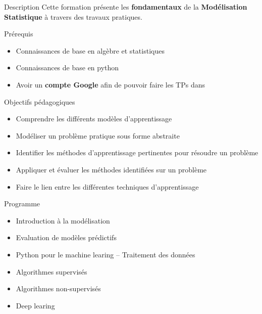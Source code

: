 
\begin{frame}{Description}
  Cette formation présente les \textbf{fondamentaux} de la \textbf{Modélisation Statistique} à travers des travaux pratiques.
\end{frame}

\begin{frame}{Prérequis}
  \begin{itemize}
  \item Connaissances de base en algèbre et statistiques
  \item Connaissances de base en python
  \item Avoir un \textbf{compte Google} afin de pouvoir faire les TPs dans 
  \end{itemize}
\end{frame}

\begin{frame}{Objectifs pédagogiques}
  \begin{itemize}
  \item Comprendre les différents modèles d'apprentissage
  \item Modéliser un problème pratique sous forme abstraite
  \item Identifier les méthodes d'apprentissage pertinentes pour résoudre un problème
  \item Appliquer et évaluer les méthodes identifiées sur un problème
  \item Faire le lien entre les différentes techniques d'apprentissage
  \end{itemize}
\end{frame}

\begin{frame}{Programme}
  \begin{itemize}
  \item Introduction à la modélisation
  \item Evaluation de modèles prédictifs
  \item Python pour le machine learing -- Traitement des données
  \item Algorithmes supervisés
  \item Algorithmes non-supervisés
  \item Deep learing
  \end{itemize}
\end{frame}
